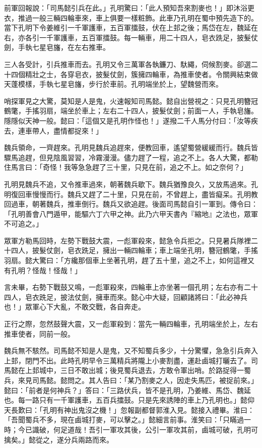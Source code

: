前軍回報說：「司馬懿引兵在此。」孔明驚曰：「此人預知吾來割麥也！」即沐浴更衣，推過一般三輛四輪車來，車上俱要一樣粧飾。此車乃孔明在蜀中預先造下的。當下孔明下令姜維引一千軍護車，五百軍擂鼓，伏在上邽之後；馬岱在左，魏延在右，亦各引一千軍護車，五百軍擂鼓。每一輛車，用二十四人，皂衣跣足，披髮仗劍，手執七星皂旛，在左右推車。

三人各受計，引兵推車而去。孔明又令三萬軍各執鐮刀、馱繩，伺候割麥。卻選二十四個精壯之士，各穿皂衣，披髮仗劍，簇擁四輪車，為推車使者。令關興結束做天蓬模樣，手執七星皂旛，步行於車前。孔明端坐於上，望魏營而來。

哨探軍見之大驚，莫知是人是鬼，火速報知司馬懿。懿自出營視之：只見孔明簪冠鶴氅，手搖羽扇，端坐於車上；左右二十四人，披髮仗劍；前面一人，手執皂旛。隱隱似天神一般。懿曰：「這個又是孔明作怪也！」遂撥二千人馬分付曰：「汝等疾去，連車帶人，盡情都捉來！」

魏兵領命，一齊趕來。孔明見魏兵追趕來，便教回車，遙望蜀營緩緩而行。魏兵皆驟馬追趕，但見陰風習習，冷霧漫漫。儘力趕了一程，追之不上。各人大驚，都勒住馬言曰：「奇怪！我等急急趕了三十里，只見在前，追之不上。如之奈何？」

孔明見魏兵不追，又令推車過來，朝著魏兵歇下。魏兵猶豫良久，又放馬過來。孔明復回車慢慢而行。魏兵又趕了二十里，只見在前，不曾趕上，盡皆癡呆。孔明教回過車，朝著魏兵，推車倒行。魏兵又欲追趕。後面司馬懿自引一軍到。傳令曰：「孔明善會八門遁甲，能驅六丁六甲之神。此乃六甲天書內『縮地』之法也，眾軍不可追之。」

眾軍方勒馬回時，左勢下戰鼓大震，一彪軍殺來，懿急令兵拒之。只見暑兵隊裡二十四人，披髮仗劍，皂衣跣足，擁出一輛四輪車；車上端坐孔明，簪冠鶴氅，手搖羽扇。懿大驚曰：「方纔那個車上坐著孔明，趕了五十里，追之不上，如何這裡又有孔明？怪哉！怪哉！」

言未畢，右勢下戰鼓又鳴，一彪軍殺來，四輪車上亦坐著一個孔明；左右亦有二十四人，皂衣跣足，披法仗劍，擁車而來。懿心中大疑，回顧諸將曰：「此必神兵也！」眾軍心下大亂，不敢交戰，各自奔走。

正行之際，忽然鼓聲大震，又一彪軍殺到：當先一輛四輪車，孔明端坐於上，左右推車使者，同前一般。

魏兵無不駭然。司馬懿不知是人是鬼，又不知蜀兵多少，十分驚懼，急急引兵奔入上邽，閉門不出。此時孔明早令三萬精兵將隴上小麥割盡，運赴鹵城打曬去了。司馬懿在上邽城中，三日不敢出城；後見蜀兵退去，方敢令軍出哨。於路捉得一蜀兵，來見司馬懿。懿問之。其人告曰：「某乃割麥之人，因走失馬匹，被捉前來。」懿曰：「前者是何神兵？」答曰：「三路伏兵，皆不是孔明，乃姜維、馬岱、魏延也。每一路只有一千軍護車，五百兵擂鼓。只是先來誘陣的車上乃孔明也。」懿仰天長歎曰：「孔明有神出鬼沒之機！」忽報副都督郭淮入見。懿接入禮畢。淮曰：「吾聞蜀兵不多，現在鹵城打麥，可以擊之。」懿細言前事。淮笑曰：「只瞞過一時；今已識破，何足道哉！吾引一軍攻其後，公引一軍攻其前，鹵城可破，孔明可擒矣。」懿從之，遂分兵兩路而來。

